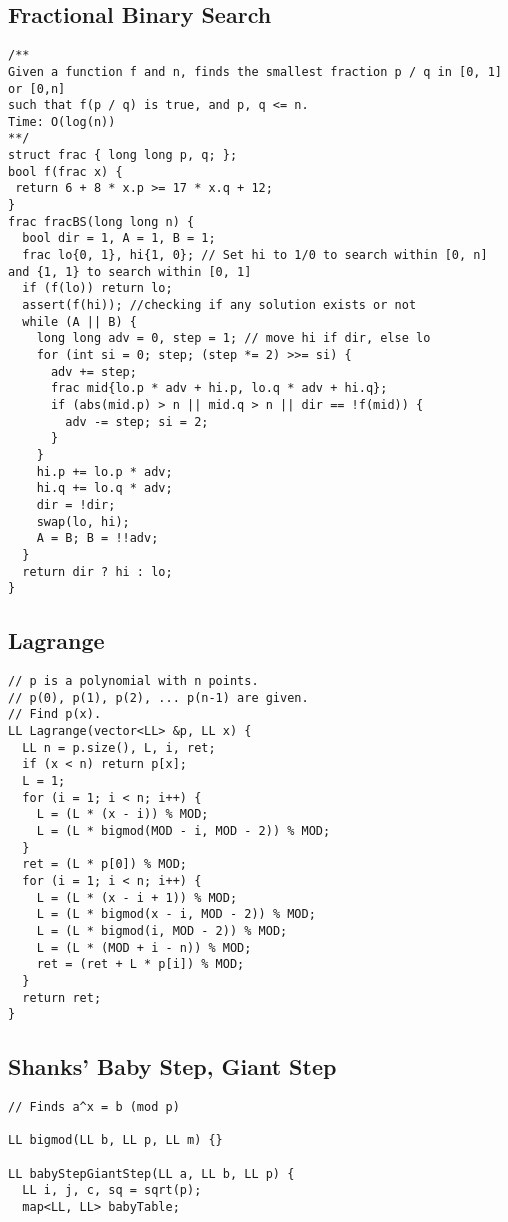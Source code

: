 \documentclass[FSZ,a4paper,onesided]{article}
\begin{document}
\begin{multicols*}{\COLS}
\begin{lstlisting}
\end{lstlisting}
\subsection{Fractional Binary Search}
\begin{lstlisting}
/**
Given a function f and n, finds the smallest fraction p / q in [0, 1] or [0,n]
such that f(p / q) is true, and p, q <= n.
Time: O(log(n))
**/
struct frac { long long p, q; };
bool f(frac x) {
 return 6 + 8 * x.p >= 17 * x.q + 12;
}
frac fracBS(long long n) {
  bool dir = 1, A = 1, B = 1;
  frac lo{0, 1}, hi{1, 0}; // Set hi to 1/0 to search within [0, n] and {1, 1} to search within [0, 1]
  if (f(lo)) return lo;
  assert(f(hi)); //checking if any solution exists or not
  while (A || B) {
    long long adv = 0, step = 1; // move hi if dir, else lo
    for (int si = 0; step; (step *= 2) >>= si) {
      adv += step;
      frac mid{lo.p * adv + hi.p, lo.q * adv + hi.q};
      if (abs(mid.p) > n || mid.q > n || dir == !f(mid)) {
        adv -= step; si = 2;
      } 
    }
    hi.p += lo.p * adv;
    hi.q += lo.q * adv;
    dir = !dir;
    swap(lo, hi);
    A = B; B = !!adv;
  }
  return dir ? hi : lo;
}
\end{lstlisting}
\subsection{Lagrange}
\begin{lstlisting}
// p is a polynomial with n points.
// p(0), p(1), p(2), ... p(n-1) are given.
// Find p(x).
LL Lagrange(vector<LL> &p, LL x) {
  LL n = p.size(), L, i, ret;
  if (x < n) return p[x];
  L = 1;
  for (i = 1; i < n; i++) {
    L = (L * (x - i)) % MOD;
    L = (L * bigmod(MOD - i, MOD - 2)) % MOD;
  }
  ret = (L * p[0]) % MOD;
  for (i = 1; i < n; i++) {
    L = (L * (x - i + 1)) % MOD;
    L = (L * bigmod(x - i, MOD - 2)) % MOD;
    L = (L * bigmod(i, MOD - 2)) % MOD;
    L = (L * (MOD + i - n)) % MOD;
    ret = (ret + L * p[i]) % MOD;
  }
  return ret;
}
\end{lstlisting}
\subsection{Shanks' Baby Step, Giant Step}
\begin{lstlisting}
// Finds a^x = b (mod p)

LL bigmod(LL b, LL p, LL m) {}

LL babyStepGiantStep(LL a, LL b, LL p) {
  LL i, j, c, sq = sqrt(p);
  map<LL, LL> babyTable;


\end{lstlisting}
\end{multicols*}
\end{document}
